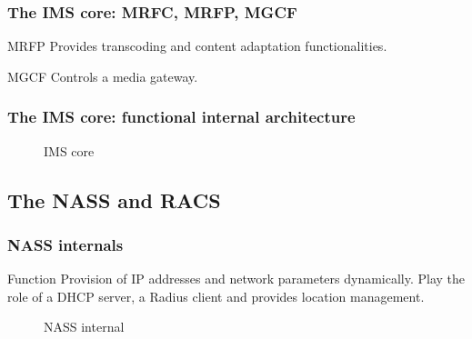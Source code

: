 \documentclass[pdf]{beamer}
\begin{document}
    \begin{frame} 
        \frametitle{The IMS core: MRFC, MRFP, MGCF}
     \begin{overprint}     
         \begin{block}{MRFP}
                Provides transcoding and content adaptation functionalities.
         \end{block}
         \begin{block}{MGCF}
                Controls a media gateway.
         \end{block}               
     \end{overprint}
    \end{frame}     

   
    \begin{frame}
        \frametitle{The IMS core: functional internal architecture}   
        \begin{center}
            \begin{figure}
    \caption{IMS core}
    \end{figure}     
        \end{center}
    \end{frame}     

   
    \subsection[NASS \& RACS]{The NASS and RACS}
    \begin{frame}
        \frametitle{NASS internals}
     \begin{block}{Function}       
        Provision of IP addresses and network parameters dynamically. Play the role of a DHCP server, a Radius client and provides location management.
     \end{block}         
        \begin{center}
            \begin{figure}
       \caption{NASS internal  }
        \end{figure}
        \end{center}         
    \end{frame}     
   
\end{document}
